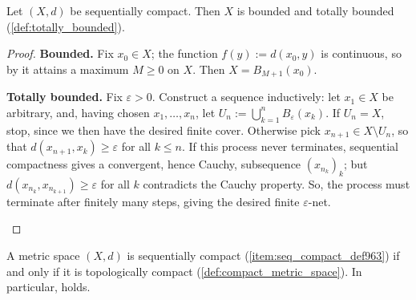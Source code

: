 \begin{lemma}
\label{lem:sequentially_compact_totally_bounded}
Let $(X,d)$ be sequentially compact. Then $X$ is bounded and totally bounded
(\cref{def:totally_bounded}).
\end{lemma}

\begin{proof}
\textbf{Bounded.} Fix $x_0 \in X$; the function $f(y) := d(x_0,y)$ is continuous, so by
 it attains a maximum $M \geq 0$ on $X$. Then
$X = B_{M+1}(x_0)$.

\textbf{Totally bounded.} Fix $\varepsilon > 0$. Construct a sequence inductively: let
$x_1 \in X$ be arbitrary, and, having chosen $x_1,\dots,x_n$, let
$U_n := \bigcup_{k=1}^n B_\varepsilon(x_k)$. If $U_n = X$, stop, since we then have the desired
finite cover. Otherwise pick $x_{n+1} \in X\setminus U_n$, so that $d(x_{n+1},x_k) \geq \varepsilon$ for
all $k \leq n$. If this process never terminates, sequential compactness gives a convergent, hence
Cauchy, subsequence $(x_{n_k})_k$; but $d(x_{n_k},x_{n_{k+1}}) \geq \varepsilon$ for all $k$
contradicts the Cauchy property. So, the process must terminate after finitely many steps, giving
the desired finite $\varepsilon$-net.

\begin{center}
\end{center}
\end{proof}

\begin{theorem}
\label{thm:sequential_topological_compactness_equivalence}
A metric space $(X,d)$ is sequentially compact (\cref{item:seq_compact_def963}) if and only if it
is topologically compact (\cref{def:compact_metric_space}). In particular,
 holds.
\end{theorem}

